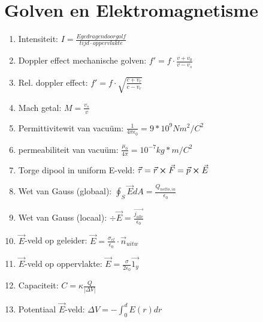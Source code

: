 \documentclass[12pt]{article}
\begin{document}
    \maketitle

    \section{Golven en Elektromagnetisme}%
    \label{sec:section_name}
    
    \begin{enumerate}
	    \item Intensiteit: $ I = \frac{E gedragen door golf}{tijd \cdot oppervlakte}$ 
	    \item Doppler effect mechanische golven: $ f' = f \cdot \frac{v+v_0}{v-v_s}$
	    \item Rel. doppler effect: $ f' = f \cdot \sqrt{\frac{c+v_r}{c-v_r}} $
	    \item Mach getal:  $ M = \frac{v_s}{v} $
	    \item Permittivitewit van vacu\"um: $ \frac{1}{4\pi\epsilon_0} = 9* 10^9 Nm^2/C^2 $
	    \item permeabiliteit van vacu\"um: $ \frac{\mu_0}{4\pi} = 10^{-7} kg*m/C^2 $
	    \item Torge dipool in uniform E-veld: $ \vec{\tau} = \vec{r}\cross\vec{F} = \vec{p} \cross \vec{E} $
	    \item Wet van Gauss (globaal): $ \oint_S \vec{E} dA = \frac{Q_{netto,in}}{\epsilon_0} $
	    \item Wet van Gauss (locaal): $ \div \vec{E} = \frac{\vec{j_{alle}}}{\epsilon_0} $
	    \item $ \vec{E}$-veld op geleider: $ \vec{E} = \frac{\sigma_{el}}{\epsilon_0} \cdot \vec{n}_{uitw} $
	    \item $ \vec{E}$-veld op oppervlakte: $ \vec{E} = \frac{\sigma}{2 \epsilon_0} \vec{1_y} $
	    \item Capaciteit: $ C = \kappa \frac{Q}{|\Delta V|} $
	    \item Potentiaal $ \vec{E}$-veld: $ \Delta V = -\int_0^d E(r) dr $
    \end{enumerate}
\end{document}
